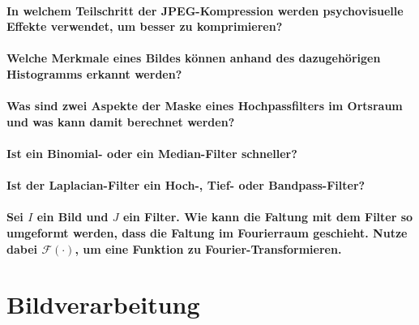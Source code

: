 \paragraph{In welchem Teilschritt der JPEG-Kompression werden psychovisuelle Effekte verwendet, um besser zu komprimieren?}

\paragraph{Welche Merkmale eines Bildes können anhand des dazugehörigen Histogramms erkannt werden?}

\paragraph{Was sind zwei Aspekte der Maske eines Hochpassfilters im Ortsraum und was kann damit berechnet werden?}

\paragraph{Ist ein Binomial- oder ein Median-Filter schneller?}

\paragraph{Ist der Laplacian-Filter ein Hoch-, Tief- oder Bandpass-Filter?}

\paragraph{Sei \(I\) ein Bild und \(J\) ein Filter. Wie kann die Faltung mit dem Filter so umgeformt werden, dass die Faltung im Fourierraum geschieht. Nutze dabei \( \mathcal{F}(\cdot) \), um eine Funktion zu Fourier-Transformieren.}

\section{Bildverarbeitung}
